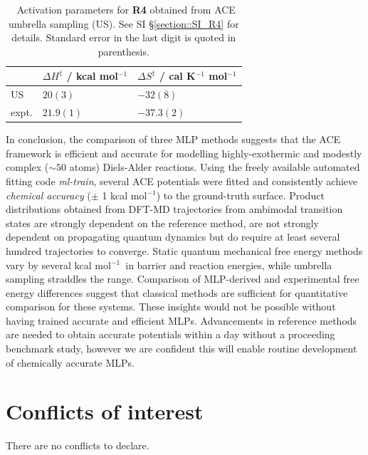 \documentclass[twoside,twocolumn,9pt]{article}
\newcommand{\kcal}{kcal mol$^{-1}$}
\begin{document}
\begin{table}[h]
	\small
	\caption{\ Activation parameters for {\bfseries{R4}} obtained from ACE umbrella sampling (US). See SI §\ref{section::SI_R4} for details. Standard error in the last digit is quoted in parenthesis.}
	\label{tbl::X1}
	\vspace{-0.2cm}
	\renewcommand{\arraystretch}{1.4}
	\begin{tabular*}{0.48\textwidth}{@{\extracolsep{\fill}}lll}
		\hline
		 & $\Delta H^\ddagger$ / \kcal & $\Delta S^\ddagger$ / cal K${}^{-1}$ mol$^{-1}$ \\
		\hline
		US & $20(3)$ & $-32(8)$ \\
		expt.\cite{Walsh1975} & $21.9(1)$ & $-37.3(2)$ \\
		\hline
	\end{tabular*}
\end{table}




\vspace{0.2cm}
In conclusion, the comparison of three MLP methods suggests that the ACE framework is efficient and accurate for modelling highly-exothermic and modestly complex ($\sim 50$ atoms) Diels-Alder reactions. Using the freely available automated fitting code \emph{ml-train}\cite{Young2021mlt}, several ACE potentials were fitted and consistently achieve \emph{chemical accuracy} ($\pm$ 1 \kcal) to the ground-truth surface. Product distributions obtained from DFT-MD trajectories from ambimodal transition states are strongly dependent on the reference method, are not strongly dependent on propagating quantum dynamics but do require at least several hundred trajectories to converge. Static quantum mechanical free energy methods vary by several \kcal~in barrier and reaction energies, while umbrella sampling straddles the range. Comparison of MLP-derived and experimental free energy differences suggest that classical methods are sufficient for quantitative comparison for these systems. These insights would not be possible without having trained accurate and efficient MLPs. Advancements in reference methods are needed to obtain accurate potentials within a day without a proceeding benchmark study, however we are confident this will enable routine development of chemically accurate MLPs.


\section*{Conflicts of interest}
There are no conflicts to declare.
\end{document}
